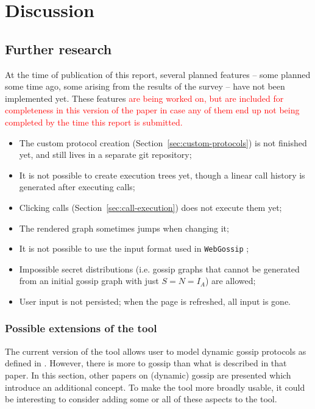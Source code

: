 
\section{Discussion}

\subsection{Further research}

At the time of publication of this report, several planned features -- some planned some time ago, some arising from the results of the survey -- have not been implemented yet.
These features \textcolor{red}{are being worked on, but are included for completeness in this version of the paper in case any of them end up not being completed by the time this report is submitted.}

\begin{itemize}
    \item The custom protocol creation (Section~\ref{sec:custom-protocols}) is not finished yet, and still lives in a separate git repository;
    \item It is not possible to create execution trees yet, though a linear call history is generated after executing calls;
    \item Clicking calls (Section~\ref{sec:call-execution}) does not execute them yet;
    \item The rendered graph sometimes jumps when changing it;
    \item It is not possible to use the input format used in \texttt{WebGossip} \parencite{gattinger_webgossip_nodate};
    \item Impossible secret distributions (i.e. gossip graphs that cannot be generated from an initial gossip graph with just \(S = N = I_A \)) are allowed;
    \item User input is not persisted; when the page is refreshed, all input is gone.
\end{itemize}

\subsubsection{Possible extensions of the tool}

The current version of the tool allows user to model dynamic gossip protocols as defined in \textcite{van_ditmarsch_dynamic_2018}.
However, there is more to gossip than what is described in that paper.
In this section, other papers on (dynamic) gossip are presented which introduce an additional concept.
To make the tool more broadly usable, it could be interesting to consider adding some or all of these aspects to the tool.

